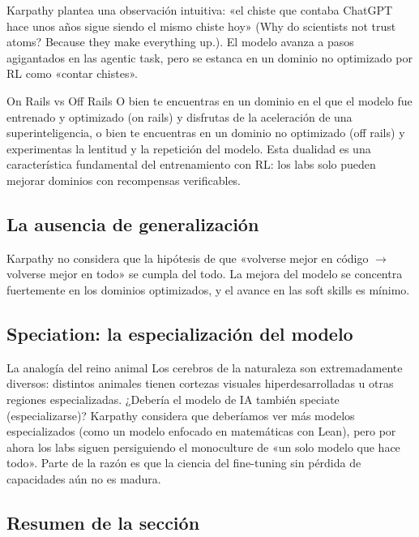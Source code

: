 \documentclass[a4paper]{article}
\begin{document}
Karpathy plantea una observación intuitiva: «el chiste que contaba ChatGPT hace unos años sigue siendo el mismo chiste hoy» (Why do scientists not trust atoms? Because they make everything up.). El modelo avanza a pasos agigantados en las agentic task, pero se estanca en un dominio no optimizado por RL como «contar chistes».

\begin{importantbox}{On Rails vs Off Rails}
O bien te encuentras en un dominio en el que el modelo fue entrenado y optimizado (on rails) y disfrutas de la aceleración de una superinteligencia, o bien te encuentras en un dominio no optimizado (off rails) y experimentas la lentitud y la repetición del modelo. Esta dualidad es una característica fundamental del entrenamiento con RL: los labs solo pueden mejorar dominios con recompensas verificables.
\end{importantbox}

\subsection{La ausencia de generalización}

Karpathy no considera que la hipótesis de que «volverse mejor en código $\rightarrow$ volverse mejor en todo» se cumpla del todo. La mejora del modelo se concentra fuertemente en los dominios optimizados, y el avance en las soft skills es mínimo.

\subsection{Speciation: la especialización del modelo}

\begin{knowledgebox}{La analogía del reino animal}
Los cerebros de la naturaleza son extremadamente diversos: distintos animales tienen cortezas visuales hiperdesarrolladas u otras regiones especializadas. ¿Debería el modelo de IA también speciate (especializarse)? Karpathy considera que deberíamos ver más modelos especializados (como un modelo enfocado en matemáticas con Lean), pero por ahora los labs siguen persiguiendo el monoculture de «un solo modelo que hace todo». Parte de la razón es que la ciencia del fine-tuning sin pérdida de capacidades aún no es madura.
\end{knowledgebox}

\subsection{Resumen de la sección}
\end{document}
